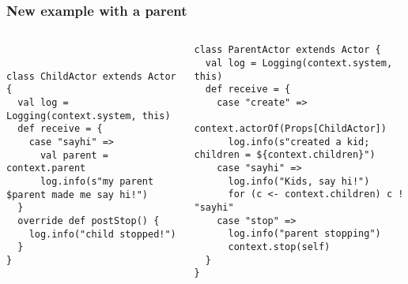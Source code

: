 \documentclass[aspectratio=169]{beamer}
\begin{document}
\begin{frame}[fragile]\frametitle{New example with a parent}

\begin{columns}
\begin{column}{0.47\textwidth}
~\\[1mm]
\centering
{}

\pause
\begin{lstlisting}[emph={Actor, Logging, Props, ourSystem,terminate,context,actorOf,receive}]
class ChildActor extends Actor {
  val log = Logging(context.system, this)
  def receive = {
    case "sayhi" =>
      val parent = context.parent
      log.info(s"my parent $parent made me say hi!")
  }
  override def postStop() {
    log.info("child stopped!")
  }
}
\end{lstlisting}
\end{column}
\begin{column}{0.54\textwidth}
\begin{lstlisting}[emph={Actor, Logging, Props, ourSystem,terminate,sleep,actorOf,receive,become,context}]
class ParentActor extends Actor {
  val log = Logging(context.system, this)
  def receive = {
    case "create" =>
      context.actorOf(Props[ChildActor])
      log.info(s"created a kid; children = ${context.children}")
    case "sayhi" =>
      log.info("Kids, say hi!")
      for (c <- context.children) c ! "sayhi"
    case "stop" =>
      log.info("parent stopping")
      context.stop(self)
  }
}
\end{lstlisting}
\end{column}
\end{columns}
\end{frame}
\end{document}
